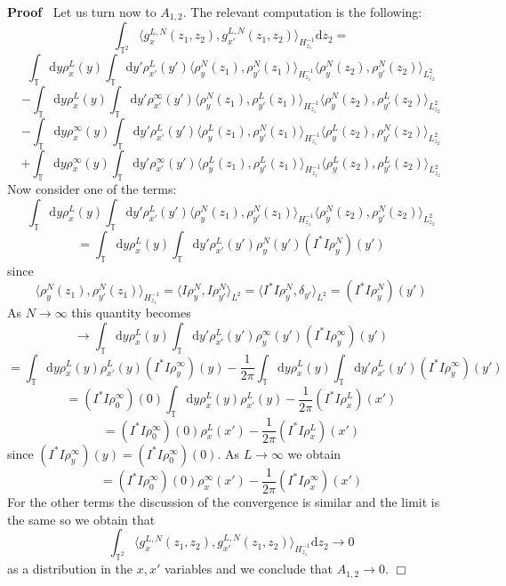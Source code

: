 \documentclass[a4paper,11pt]{article}
\newcommand{\mathd}{\mathrm{d}}
\newenvironment{proof}{\noindent\textbf{Proof\ }}{\hspace*{\fill}$\Box$\medskip}
\begin{document}
\begin{proof}
  Let us turn now to $A_{1, 2}$. The relevant computation is the following:
  \[ \int_{\mathbb{T}^2} \langle g_x^{L, N} (z_1, z_2), g_{x'}^{L, N} (z_1,
     z_2) \rangle_{H^{- 1}_{z_1}} \mathd z_2 = \]
  \[ \int_{\mathbb{T}} \mathd y \rho_x^L (y) \int_{\mathbb{T}} \mathd y'
     \rho_{x'}^L (y') \langle \rho^N_y (z_1), \rho^N_{y'} (z_1) \rangle_{H^{-
     1}_{z_1}} \langle \rho^N_y (z_2), \rho^N_{y'} (z_2) \rangle_{L^2_{z_2}}
  \]
  \[ - \int_{\mathbb{T}} \mathd y \rho_x^L (y) \int_{\mathbb{T}} \mathd y'
     \rho_{x'}^{\infty} (y') \langle \rho^N_y (z_1), \rho^L_{y'} (z_1)
     \rangle_{H^{- 1}_{z_1}} \langle \rho^N_y (z_2), \rho^L_{y'} (z_2)
     \rangle_{L^2_{z_2}} \]
  \[ - \int_{\mathbb{T}} \mathd y \rho_x^{\infty} (y) \int_{\mathbb{T}}
     \mathd y' \rho_{x'}^L (y') \langle \rho^L_y (z_1), \rho^N_{y'} (z_1)
     \rangle_{H^{- 1}_{z_1}} \langle \rho^L_y (z_2), \rho^N_{y'} (z_2)
     \rangle_{L^2_{z_2}} \]
  \[ + \int_{\mathbb{T}} \mathd y \rho_x^{\infty} (y) \int_{\mathbb{T}}
     \mathd y' \rho_{x'}^{\infty} (y') \langle \rho^L_y (z_1), \rho^L_{y'}
     (z_1) \rangle_{H^{- 1}_{z_1}} \langle \rho^L_y (z_2), \rho^L_{y'} (z_2)
     \rangle_{L^2_{z_2}} \]
  Now consider one of the terms:
  \[ \int_{\mathbb{T}} \mathd y \rho_x^L (y) \int_{\mathbb{T}} \mathd y'
     \rho_{x'}^L (y') \langle \rho^N_y (z_1), \rho^N_{y'} (z_1) \rangle_{H^{-
     1}_{z_1}} \langle \rho^N_y (z_2), \rho^N_{y'} (z_2) \rangle_{L^2_{z_2}}
  \]
  \[ = \int_{\mathbb{T}} \mathd y \rho_x^L (y) \int_{\mathbb{T}} \mathd y'
     \rho_{x'}^L (y') \rho^N_y (y') (I^{\ast} I \rho^N_y) (y') \]
  since
  \[ \langle \rho^N_y (z_1), \rho^N_{y'} (z_1) \rangle_{H^{- 1}_{z_1}} =
     \langle I \rho^N_y, I \rho^N_{y'} \rangle_{L^2} = \langle I^{\ast} I
     \rho^N_y, \delta_{y'} \rangle_{L^2} = (I^{\ast} I \rho^N_y) (y') \]
  As $N \rightarrow \infty$ this quantity becomes
  \[ \rightarrow \int_{\mathbb{T}} \mathd y \rho_x^L (y) \int_{\mathbb{T}}
     \mathd y' \rho_{x'}^L (y') \rho^{\infty}_y (y') (I^{\ast} I
     \rho^{\infty}_y) (y') \]
  \[ = \int_{\mathbb{T}} \mathd y \rho_x^L (y) \rho_{x'}^L (y) (I^{\ast} I
     \rho^{\infty}_y) (y) - \frac{1}{2 \pi} \int_{\mathbb{T}} \mathd y
     \rho_x^L (y) \int_{\mathbb{T}} \mathd y' \rho_{x'}^L (y') (I^{\ast} I
     \rho^{\infty}_y) (y') \]
  \[ = (I^{\ast} I \rho^{\infty}_0) (0) \int_{\mathbb{T}} \mathd y \rho_x^L
     (y) \rho_{x'}^L (y) - \frac{1}{2 \pi} (I^{\ast} I \rho^L_x) (x') \]
  \[ = (I^{\ast} I \rho^{\infty}_0) (0) \rho_x^L (x') - \frac{1}{2 \pi}
     (I^{\ast} I \rho^L_x) (x') \]
  since $(I^{\ast} I \rho^{\infty}_y) (y) = (I^{\ast} I \rho^{\infty}_0) (0)$.
  As $L \rightarrow \infty$ we obtain
  \[ = (I^{\ast} I \rho^{\infty}_0) (0) \rho_x^{\infty} (x') - \frac{1}{2 \pi}
     (I^{\ast} I \rho^{\infty}_x) (x') \]
  For the other terms the discussion of the convergence is similar and the
  limit is the same so we obtain that
  \[ \int_{\mathbb{T}^2} \langle g_x^{L, N} (z_1, z_2), g_{x'}^{L, N} (z_1,
     z_2) \rangle_{H^{- 1}_{z_1}} \mathd z_2 \rightarrow 0 \]
  as a distribution in the $x, x'$ variables and we conclude that $A_{1, 2}
  \rightarrow 0$.
\end{proof}
\end{document}
